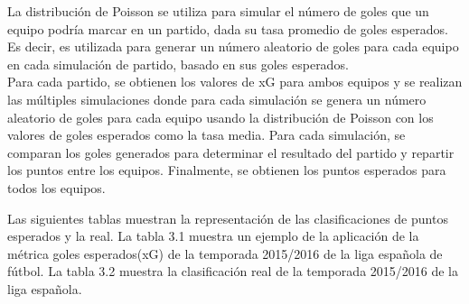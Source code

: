 La distribución de Poisson se utiliza para simular el número de goles que un equipo podría marcar en un partido, dada su tasa promedio de goles esperados. Es decir, es utilizada para generar un número aleatorio de goles para cada equipo en cada simulación de partido, basado en sus goles esperados. \\
Para cada partido, se obtienen los valores de xG para ambos equipos y se realizan las múltiples simulaciones donde para cada simulación se genera un número aleatorio de goles para cada equipo usando la distribución de Poisson con los valores de goles esperados como la tasa media. Para cada simulación, se comparan los goles generados para determinar el resultado del partido y repartir los puntos entre los equipos. Finalmente, se obtienen los puntos esperados para todos los equipos.

Las siguientes tablas muestran la representación de las clasificaciones de puntos esperados y la real.
La tabla 3.1 muestra un ejemplo de la aplicación de la métrica goles esperados(xG) de la temporada 2015/2016 de la liga española de fútbol.
La tabla 3.2 muestra la clasificación real de la temporada 2015/2016 de la liga española.

